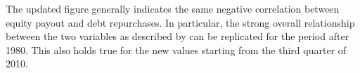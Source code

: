 The updated figure generally indicates the same negative correlation between equity payout and debt repurchases. In particular, the strong overall relationship between the two variables as described by \citeauthor{JERMANNfinancial} can be replicated for the period after 1980. This also holds true for the new values starting from the third quarter of 2010. 


